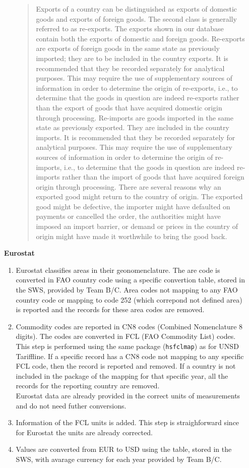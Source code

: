 \documentclass[nojss]{jss}\usepackage[]{graphicx}\usepackage[]{color}
\begin{document}
\begin{itemize}
\begin{enumerate}
\begin{quote}
Exports of a country can be distinguished as exports of domestic goods and exports of foreign goods. The second class is generally referred to as re-exports. The exports shown in our database contain both the exports of domestic and foreign goods. Re-exports are exports of foreign goods in the same state as previously imported; they are to be included in the country exports. It is recommended that they be recorded separately for analytical purposes. This may require the use of supplementary sources of information in order to determine the origin of re-exports, i.e., to determine that the goods in question are indeed re-exports rather than the export of goods that have acquired domestic origin through processing. Re-imports are goods imported in the same state as previously exported. They are included in the country imports. It is recommended that they be recorded separately for analytical purposes. This may require the use of supplementary sources of information in order to determine the origin of re-imports, i.e., to determine that the goods in question are indeed re-imports rather than the import of goods that have acquired foreign origin through processing. There are several reasons why an exported good might return to the country of origin. The exported good might be defective, the importer might have defaulted on payments or cancelled the order, the authorities might have imposed an import barrier, or demand or prices in the country of origin might have made it worthwhile to bring the good back.
\end{quote}
\end{enumerate}

\item [\bf{Eurostat}]
\begin{enumerate}
\item Eurostat classifies areas in their geonomenclature. The are code is converted in FAO country code using a specific convertion  table, stored in the SWS, provided by Team B/C.  Area codes not mapping to any FAO country code or mapping to code 252 (which correpond not defined area) is reported and the records for these area codes are removed.
\item Commodity codes are reported in CN8 codes (Combined Nomenclature 8 digits). The codes are converted in FCL (FAO Commodity List) codes. This step is performed using the same package ({\tt hsfclmap}) as for UNSD Tariffline.
If a specific record has a CN8 code not mapping to any specific FCL code, then the record is reported and removed. If a country is not included in the package of the mapping for that specific year, all the records for the reporting country are removed.\\
Eurostat data are already provided in the correct units of measurements and do not need futher conversions.
\item Information of the FCL units is added. This step is straighforward since for Eurostat the units are already corrected.
\item Values are converted from EUR to USD using the table, stored in the SWS, with avarage currency for each year provided by Team B/C.
\end{enumerate}
\end{itemize}
\end{document}
